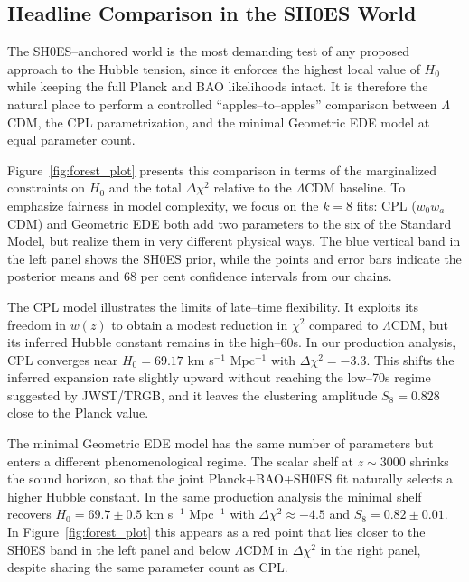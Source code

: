 \documentclass[a4paper,11pt]{article}
\begin{document}

\subsection{Headline Comparison in the SH0ES World}
\label{sec:shoes_headline}

The SH0ES--anchored world is the most demanding test of any proposed approach to the Hubble tension, since it enforces the highest local value of $H_0$ while keeping the full Planck and BAO likelihoods intact. It is therefore the natural place to perform a controlled ``apples--to--apples'' comparison between $\Lambda$CDM, the CPL parametrization, and the minimal Geometric EDE model at equal parameter count.

Figure~\ref{fig:forest_plot} presents this comparison in terms of the marginalized constraints on $H_0$ and the total $\Delta\chi^2$ relative to the $\Lambda$CDM baseline. To emphasize fairness in model complexity, we focus on the $k = 8$ fits: CPL ($w_0 w_a$CDM) and Geometric EDE both add two parameters to the six of the Standard Model, but realize them in very different physical ways. The blue vertical band in the left panel shows the SH0ES prior, while the points and error bars indicate the posterior means and 68 per cent confidence intervals from our chains.

The CPL model illustrates the limits of late--time flexibility. It exploits its freedom in $w(z)$ to obtain a modest reduction in $\chi^2$ compared to $\Lambda$CDM, but its inferred Hubble constant remains in the high--60s. In our production analysis, CPL converges near $H_0 = 69.17$ km s$^{-1}$ Mpc$^{-1}$ with $\Delta\chi^2 = -3.3$. This shifts the inferred expansion rate slightly upward without reaching the low--70s regime suggested by JWST/TRGB, and it leaves the clustering amplitude $S_8 = 0.828$ close to the Planck value.

The minimal Geometric EDE model has the same number of parameters but enters a different phenomenological regime. The scalar shelf at $z \sim 3000$ shrinks the sound horizon, so that the joint Planck+BAO+SH0ES fit naturally selects a higher Hubble constant. In the same production analysis the minimal shelf recovers $H_0 = 69.7 \pm 0.5$ km s$^{-1}$ Mpc$^{-1}$ with $\Delta\chi^2 \approx -4.5$ and $S_8 = 0.82 \pm 0.01$. In Figure~\ref{fig:forest_plot} this appears as a red point that lies closer to the SH0ES band in the left panel and below $\Lambda$CDM in $\Delta\chi^2$ in the right panel, despite sharing the same parameter count as CPL.
\end{document}
